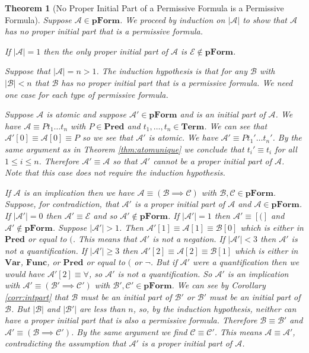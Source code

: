 \documentclass[12pt]{article}
\theoremstyle{break}
\theoremstyle{break}
\newtheorem{theorem}{Theorem}[section]
\theoremstyle{break}
\theoremstyle{break}
\newcommand{\mc}[1]{\mathcal{#1}}
\begin{document}
\begin{theorem}[No Proper Initial Part of a Permissive Formula is a Permissive Formula]
\label{thm:permpropinit}
Suppose $\mc{A}\in\textbf{pForm}$.
We proceed by induction on $|\mc{A}|$ to show that $\mc{A}$ has no proper initial part that is a permissive formula.

If $|\mc{A}| = 1$ then the only proper initial part of $\mc{A}$ is $\mc{E} \not \in \textbf{pForm}$.

Suppose that $|\mc{A}| = n>1$. 
The induction hypothesis is that for any $\mc{B}$ with $|\mc{B}|<n$ that $\mc{B}$ has no proper initial part that is a permissive formula.
We need one case for each type of permissive formula.

Suppose $\mc{A}$ is atomic and suppose $\mc{A}'\in \textbf{pForm}$ and is an initial part of $\mc{A}$.
We have $\mc{A} \equiv Pt_1\ldots t_n$ with $P\in \textbf{Pred}$ and $t_1,\ldots,t_n\in\textbf{Term}$.
We can see that $\mc{A}'[0] \equiv \mc{A}[0] \equiv  P$ so we see that $\mc{A}'$ is atomic.
We have $\mc{A}' \equiv Pt_1'\ldots t_n'$.
By the same argument as in Theorem \ref{thm:atomunique} we conclude that $t_i' \equiv t_i$ for all $1 \le i \le n$.
Therefore $\mc{A}' \equiv \mc{A}$ so that $\mc{A}'$ cannot be a proper initial part of $\mc{A}$.
Note that this case does not require the induction hypothesis.

If $\mc{A}$ is an implication then we have $\mc{A} \equiv (\mc{B} \implies \mc{C})$ with $\mc{B}, \mc{C} \in \textbf{pForm}$.
Suppose, for contradiction, that $\mc{A}'$ is a proper initial part of $\mc{A}$ and $\mc{A}\in\textbf{pForm}$.
If $|\mc{A}'| = 0$ then $\mc{A}' \equiv \mc{E}$ and so $\mc{A}' \not \in \textbf{pForm}$.
If $|\mc{A}'| = 1$ then $\mc{A}' \equiv [(]$ and $\mc{A}' \not\in \textbf{pForm}$.
Suppose $|\mc{A}'|>1$.
Then $\mc{A}'[1] \equiv \mc{A}[1] \equiv \mc{B}[0]$ which is either in $\textbf{Pred}$ or equal to $($. This means that $\mc{A}'$ is not a negation.
If $|\mc{A}'| < 3$ then $\mc{A}'$ is not a quantification.
If $|\mc{A}'| \ge 3$ then $\mc{A}'[2] \equiv \mc{A}[2] \equiv \mc{B}[1]$ which is either in $\textbf{Var}$, $\textbf{Func}$, or $\textbf{Pred}$ or equal to $($ or $\lnot$. But if $\mc{A}'$ were a quantification then we would have $\mc{A}'[2] \equiv \forall$, so $\mc{A}'$ is not a quantification.
So $\mc{A}'$ is an implication with $\mc{A}' \equiv (\mc{B}' \implies \mc{C}')$ with $\mc{B}', \mc{C}' \in \textbf{pForm}$.
We can see by Corollary \ref{corr:intpart} that $\mc{B}$ must be an initial part of $\mc{B'}$ or $\mc{B}'$ must be an initial part of $\mc{B}$.
But $|\mc{B}|$ and $|\mc{B}'|$ are less than $n$, so, by the induction hypothesis, neither can have a proper initial part that is also a permissive formula.
Therefore $\mc{B} \equiv \mc{B}'$ and $\mc{A}' \equiv (\mc{B} \implies \mc{C}')$.
By the same argument we find $\mc{C} \equiv \mc{C}'$.
This means $\mc{A} \equiv \mc{A}'$, contradicting the assumption that $\mc{A}'$ is a proper initial part of $\mc{A}$.


\end{theorem}
\end{document}

